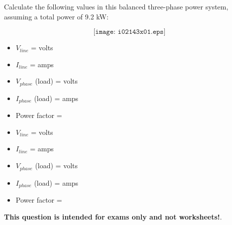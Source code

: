 

Calculate the following values in this balanced three-phase power system, assuming a total power of 9.2 kW:

$$\texttt{[image: i02143x01.eps]}$$

\begin{itemize}
\item{} $V_{line}$ = \underbar{\hskip 50pt} volts
\vskip 10pt
\item{} $I_{line}$ = \underbar{\hskip 50pt} amps 
\vskip 10pt
\item{} $V_{phase}$ (load) = \underbar{\hskip 50pt} volts 
\vskip 10pt
\item{} $I_{phase}$ (load) = \underbar{\hskip 50pt} amps 
\vskip 10pt
\item{} Power factor = \underbar{\hskip 50pt}
\end{itemize}







\begin{itemize}
\item{} $V_{line}$ =  volts
\vskip 10pt
\item{} $I_{line}$ =  amps 
\vskip 10pt
\item{} $V_{phase}$ (load) =  volts 
\vskip 10pt
\item{} $I_{phase}$ (load) =  amps 
\vskip 10pt
\item{} Power factor = 
\end{itemize}








{\bf This question is intended for exams only and not worksheets!}.


